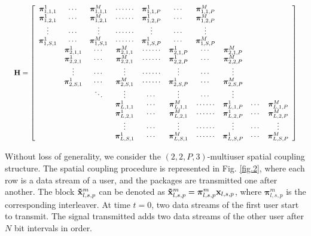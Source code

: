 \documentclass[conference]{IEEEtran}
\begin{document}
\begin{equation}
\resizebox{1\hsize}{!}{
$\bf{H} = \left[ {\begin{array}{*{20}{c}}
{{\bm{\pi }}_{1,1,1}^1}& \cdots &{{\bm{\pi }}_{1,1,1}^M}&{ \cdots  \cdots }&{{\bm{\pi }}_{1,1,P}^1}& \cdots &{{\bm{\pi }}_{1,1,P}^M}&{}&{}&{}\\
{{\bm{\pi }}_{1,2,1}^1}& \cdots &{{\bm{\pi }}_{1,2,1}^M}&{ \cdots  \cdots }&{{\bm{\pi }}_{1,2,P}^1}& \cdots &{{\bm{\pi }}_{1,2,P}^M}&{}&{}&{}\\
 \vdots & \cdots & \vdots &{ \cdots  \cdots }& \vdots & \cdots &\vdots&{}&{}&{}\\
{{\bm{\pi }}_{1,S,1}^1}& \cdots &{{\bm{\pi }}_{1,S,1}^M}&{ \cdots  \cdots }&{{\bm{\pi }}_{1,S,P}^1}& \cdots &{{\bm{\pi }}_{1,S,P}^M}&{}&{}&{}\\
{}&{{\bm{\pi }}_{2,1,1}^1}& \cdots &{{\bm{\pi }}_{2,1,1}^M}&{ \cdots  \cdots }&{{\bm{\pi }}_{2,1,P}^1}& \cdots &{{\bm{\pi }}_{2,1,P}^M}&{}&{}\\
{}&{{\bm{\pi }}_{2,2,1}^1}& \cdots &{{\bm{\pi }}_{2,2,1}^M}&{ \cdots  \cdots }&{{\bm{\pi }}_{2,2,P}^1}& \cdots &{{\bm{\pi }}_{2,2,P}^M}&{}&{}\\
{}& \vdots & \cdots & \vdots &{ \cdots  \cdots }& \vdots & \cdots & \vdots &{}&{}\\
{}&{{\bm{\pi }}_{2,S,1}^1}& \cdots &{{\bm{\pi }}_{2,S,1}^M}&{ \cdots  \cdots }&{{\bm{\pi }}_{2,S,P}^1}& \cdots &{{\bm{\pi }}_{2,S,P}^M}&{}&{}\\
{}&{}& \ddots & \vdots & \cdots & \vdots & \cdots & \vdots &{}&{}\\
{}&{}&{}&{{\bm{\pi }}_{L,1,1}^1}& \cdots &{{\bm{\pi }}_{L,1,1}^M}&{ \cdots  \cdots }&{{\bm{\pi }}_{L,1,P}^1}& \cdots &{{\bm{\pi }}_{L,1,P}^M}\\
{}&{}&{}&{{\bm{\pi }}_{L,2,1}^1}& \cdots &{{\bm{\pi }}_{L,2,1}^M}&{ \cdots  \cdots }&{{\bm{\pi }}_{L,2,P}^1}& \cdots &{{\bm{\pi }}_{L,2,P}^M}\\
{}&{}&{}& \vdots & \cdots & \vdots &{ \cdots  \cdots }& \vdots & \cdots & \vdots \\
{}&{}&{}&{{\bm{\pi }}_{L,S,1}^1}& \cdots &{{\bm{\pi }}_{L,S,1}^M}&{ \cdots  \cdots }&{{\bm{\pi }}_{L,S,P}^1}& \cdots &{{\bm{\pi }}_{L,S,P}^M}
\end{array}} \right]$
}\label{1}
\end{equation}

Without loss of generality, we consider the $\left( {2,2,P,3} \right)$-multiuser spatial coupling structure. The spatial coupling procedure is represented in Fig. \ref{fig.2}, where each row is a data stream of a user, and the packages are transmitted one after another.
The block ${\bf{\tilde x}}_{l,s,p}^m$ can be denoted as ${\bf{\tilde x}}_{l,s,p}^m = {\bm{\pi }}_{l,s,p}^m{{\bf{x}}_{l,s,p}}$, where ${\bm{\pi }}_{l,s,p}^m$ is the corresponding interleaver. At time $t = 0$, two data streams of the first user start to transmit. The signal transmitted adds two data streams of the other user after $N$ bit intervals in order.
\end{document}
